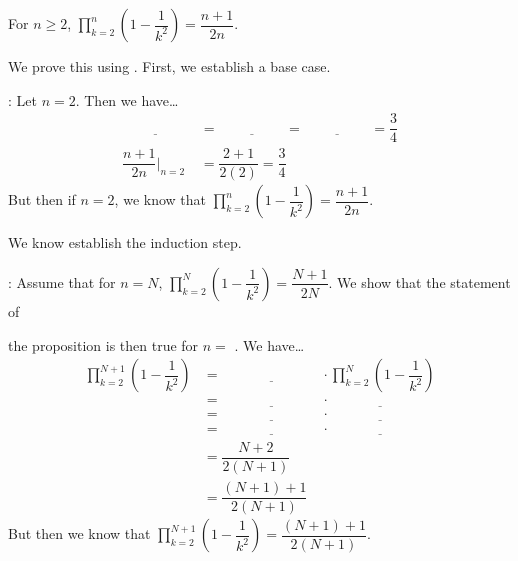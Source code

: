 \documentclass[11pt,letterpaper]{article}
\begin{document}
 For $n \geq 2$, $\displaystyle\prod_{k=2}^n \left(1 - \dfrac{1}{k^2} \right)= \dfrac{n + 1}{2n}$. \pspace

 We prove this using \underline{\hspace{6cm}}. First, we establish a base case. \pspace

: Let $n= 2$. Then we have\dots
	\[
	\begin{aligned}
	\underline{\hspace{2cm}}&= \underline{\hspace{2cm}}= \underline{\hspace{2cm}}= \dfrac{3}{4} \\[0.3cm]
	\dfrac{n + 1}{2n} \bigg|_{n= 2}&= \dfrac{2 + 1}{2(2)}= \dfrac{3}{4}
	\end{aligned}
	\]
But then if $n= 2$, we know that $\displaystyle\prod_{k=2}^n \left(1 - \dfrac{1}{k^2} \right)= \dfrac{n + 1}{2n}$. \pspace

We know establish the induction step. \pspace

: Assume that for $n= N$, $\displaystyle\prod_{k=2}^N \left(1 - \dfrac{1}{k^2} \right)= \dfrac{N + 1}{2N}$. We show that the statement of \pspace 

the proposition is then true for $n=$ \underline{\hspace{2cm}}. We have\dots \pspace
	\[
	\begin{aligned}
	\prod_{k=2}^{N+1} \left(1 - \dfrac{1}{k^2} \right)&= \underline{\hspace{3cm}} \cdot \prod_{k=2}^N \left(1 - \dfrac{1}{k^2} \right) \\[0.3cm]
	&= \underline{\hspace{3cm}} \cdot \underline{\hspace{3cm}} \\[0.3cm]
	&= \underline{\hspace{3cm}} \cdot \underline{\hspace{3cm}} \\[0.3cm]
	&= \underline{\hspace{3cm}} \cdot \underline{\hspace{3cm}} \\[0.3cm]
	&= \dfrac{N + 2}{2(N + 1)} \\[0.3cm]
	&= \dfrac{(N + 1) + 1}{2(N + 1)}
	\end{aligned}
	\]
But then we know that $\displaystyle\prod_{k=2}^{N+1} \left(1 - \dfrac{1}{k^2} \right)= \dfrac{(N + 1) + 1}{2(N + 1)}$. \pspace
\end{document}
